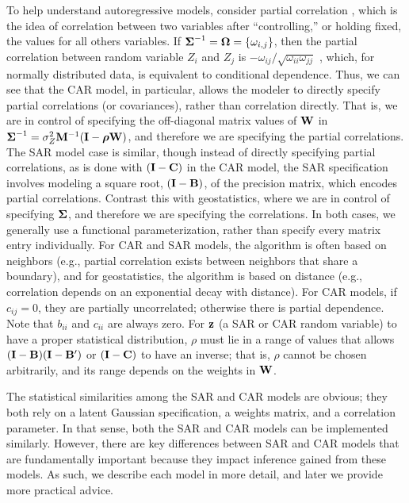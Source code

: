 \documentclass[11pt, titlepage]{article}\usepackage[]{graphicx}\usepackage[]{color}
\begin{document}
\begin{spacing}{1.9}
\begin{flushleft}
To help understand autoregressive models, consider partial correlation \citep[e.g.,][pg. 361]{Sned:Coch:stat:1980}, which is the idea of correlation between two variables after ``controlling,'' or holding fixed, the values for all others variables. If $\mbox{\boldmath $\Sigma$}^{-1} = \mbox{\boldmath $\Omega$} = \{\omega_{i,j}\}$, then the partial correlation between random variable $Z_i$ and $Z_j$ is $-\omega_{ij}/\sqrt{\omega_{ii}\omega_{jj}}$ \citep[pg. 120]{Laur:grap:1996}, which, for normally distributed data, is equivalent to conditional dependence. Thus, we can see that the CAR model, in particular, allows the modeler to directly specify partial correlations (or covariances), rather than correlation directly. That is, we are in control of specifying the off-diagonal matrix values of $\mathbf{W}$ in $\mbox{\boldmath $\Sigma$}^{-1} = \sigma^2_Z\mathbf{M}^{-1}(\mathbf{I}-\mbox{\boldmath $\rho$}\mathbf{W})$, and therefore we are specifying the partial correlations. The SAR model case is similar, though instead of directly specifying partial correlations, as is done with $(\mathbf{I} - \mathbf{C})$ in the CAR model, the SAR specification involves modeling a square root, $(\mathbf{I} - \mathbf{B})$, of the precision matrix, which encodes partial correlations. Contrast this with geostatistics, where we are in control of specifying $\mbox{\boldmath $\Sigma$}$, and therefore we are specifying the correlations.  In both cases, we generally use a functional parameterization, rather than specify every matrix entry individually.  For CAR and SAR models, the algorithm is often based on neighbors (e.g., partial correlation exists between neighbors that share a boundary), and for geostatistics, the algorithm is based on distance (e.g., correlation depends on an exponential decay with distance). For CAR models, if $c_{ij} = 0$, they are partially uncorrelated; otherwise there is partial dependence. Note that $b_{ii}$ and $c_{ii}$ are always zero.  For $\mathbf{z}$ (a SAR or CAR random variable) to have a proper statistical distribution, $\rho$ must lie in a range of values that allows $(\mathbf{I}-\mathbf{B})(\mathbf{I}-\mathbf{B}^{\prime})$ or $(\mathbf{I} - \mathbf{C})$ to have an inverse; that is, $\rho$ cannot be chosen arbitrarily, and its range depends on the weights in $\mathbf{W}$.

The statistical similarities among the SAR and CAR models are obvious; they both rely on a latent Gaussian specification, a weights matrix, and a correlation parameter. In that sense, both the SAR and CAR models can be implemented similarly. However, there are key differences between SAR and CAR models that are fundamentally important because they impact inference gained from these models. As such, we describe each model in more detail, and later we provide more practical advice.


\end{flushleft}
\end{spacing}
\end{document}
